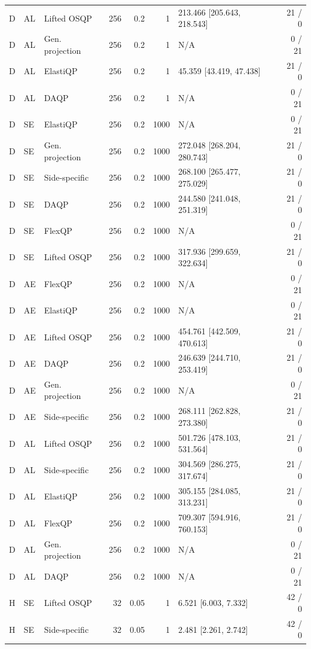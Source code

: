 \begin{longtable}{@{}lllrrrlr@{}}
D & AL & Lifted OSQP & 256 & 0.2 & 1 & 213.466 [205.643, 218.543] & 21 / 0 \\
D & AL & Gen. projection & 256 & 0.2 & 1 & N/A & 0 / 21 \\
D & AL & ElastiQP & 256 & 0.2 & 1 & 45.359 [43.419, 47.438] & 21 / 0 \\
D & AL & DAQP & 256 & 0.2 & 1 & N/A & 0 / 21 \\
D & SE & ElastiQP & 256 & 0.2 & 1000 & N/A & 0 / 21 \\
D & SE & Gen. projection & 256 & 0.2 & 1000 & 272.048 [268.204, 280.743] & 21 / 0 \\
D & SE & Side-specific & 256 & 0.2 & 1000 & 268.100 [265.477, 275.029] & 21 / 0 \\
D & SE & DAQP & 256 & 0.2 & 1000 & 244.580 [241.048, 251.319] & 21 / 0 \\
D & SE & FlexQP & 256 & 0.2 & 1000 & N/A & 0 / 21 \\
D & SE & Lifted OSQP & 256 & 0.2 & 1000 & 317.936 [299.659, 322.634] & 21 / 0 \\
D & AE & FlexQP & 256 & 0.2 & 1000 & N/A & 0 / 21 \\
D & AE & ElastiQP & 256 & 0.2 & 1000 & N/A & 0 / 21 \\
D & AE & Lifted OSQP & 256 & 0.2 & 1000 & 454.761 [442.509, 470.613] & 21 / 0 \\
D & AE & DAQP & 256 & 0.2 & 1000 & 246.639 [244.710, 253.419] & 21 / 0 \\
D & AE & Gen. projection & 256 & 0.2 & 1000 & N/A & 0 / 21 \\
D & AE & Side-specific & 256 & 0.2 & 1000 & 268.111 [262.828, 273.380] & 21 / 0 \\
D & AL & Lifted OSQP & 256 & 0.2 & 1000 & 501.726 [478.103, 531.564] & 21 / 0 \\
D & AL & Side-specific & 256 & 0.2 & 1000 & 304.569 [286.275, 317.674] & 21 / 0 \\
D & AL & ElastiQP & 256 & 0.2 & 1000 & 305.155 [284.085, 313.231] & 21 / 0 \\
D & AL & FlexQP & 256 & 0.2 & 1000 & 709.307 [594.916, 760.153] & 21 / 0 \\
D & AL & Gen. projection & 256 & 0.2 & 1000 & N/A & 0 / 21 \\
D & AL & DAQP & 256 & 0.2 & 1000 & N/A & 0 / 21 \\
H & SE & Lifted OSQP & 32 & 0.05 & 1 & 6.521 [6.003, 7.332] & 42 / 0 \\
H & SE & Side-specific & 32 & 0.05 & 1 & 2.481 [2.261, 2.742] & 42 / 0 \\

\end{longtable}
